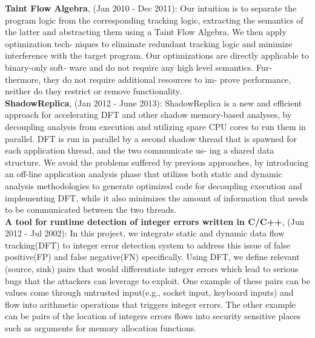 \documentclass[10pt,a4]{article}
\begin{document}
\begin{small}
\begin{itemize}
  {\bf Taint Flow Algebra}, (Jan 2010 - Dec 2011): Our intuition is to separate
  the program logic from the corresponding tracking logic, extracting the
  semantics of the latter and abstracting them using a Taint Flow Algebra. We
  then apply optimization tech- niques to eliminate redundant tracking logic and
  minimize interference with the target program. Our optimizations are
  directly applicable to binary-only soft- ware and do not require any high
  level semantics. Fur- thermore, they do not require additional resources to
  im- prove performance, neither do they restrict or remove functionality.\\

  {\bf ShadowReplica}, (Jan 2012 - June 2013): ShadowReplica is a new and
  efficient approach for accelerating DFT and other shadow memory-based
  analyses, by decoupling analysis from execution and utilizing spare CPU
  cores to run them in parallel. DFT is run in parallel by a second shadow
  thread that is spawned for each application thread, and the two communicate
  us- ing a shared data structure. We avoid the problems suffered by previous
  approaches, by introducing an off-line application analysis phase that
  utilizes both static and dynamic analysis methodologies to generate
  optimized code for decoupling execution and implementing DFT, while it also
  minimizes the amount of information that needs to be communicated between
  the two threads.\\
%

  {\bf A tool for runtime detection of integer errors written in C/C++}, (Jun
  2012 - Jul 2002): In this project, we integrate static and dynamic data flow
  tracking(DFT) to integer error detection system to address this issue of false
  positive(FP) and false negative(FN) specifically. Using DFT, we define
  relevant (source, sink) pairs that would differentiate integer errors which
  lead to serious bugs that the attackers can leverage to exploit. One example
  of these pairs can be values come through untrusted input(e.g., socket input,
  keyboard inputs) and flow into arithmetic operations that triggers integer
  errors. The other example can be pairs of the location of integers errors
  flows into security sensitive places such as arguments for memory allocation
  functions. \\
\end{itemize}



\end{small}
\end{document}

